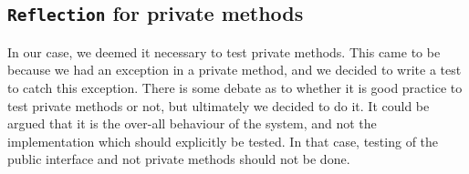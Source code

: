 
%
%
%

\subsection{\texttt{Reflection} for private methods}\label{sec:privTest}
In our case, we deemed it necessary to test private methods. This came to be because we had an exception in a private method, and we decided to write a test to catch this exception. There is some debate as to whether it is good practice to test private methods or not, but ultimately we decided to do it. It could be argued that it is the over-all behaviour of the system, and not the implementation which should explicitly be tested. In that case, testing of the public interface and not private methods should not be done.
% 